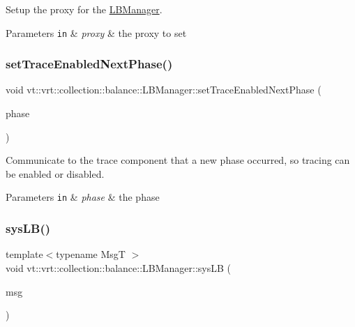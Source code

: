 Setup the proxy for the \hyperlink{structvt_1_1vrt_1_1collection_1_1balance_1_1_l_b_manager}{L\+B\+Manager}. 


\begin{DoxyParams}[1]{Parameters}
\mbox{\tt in}  & {\em proxy} & the proxy to set \\
\hline
\end{DoxyParams}
\mbox{\label{structvt_1_1vrt_1_1collection_1_1balance_1_1_l_b_manager_abb0411627a6282d0c08dd1c6b42046f7}} 
\subsubsection{\texorpdfstring{set\+Trace\+Enabled\+Next\+Phase()}{setTraceEnabledNextPhase()}}
{\footnotesize\ttfamily void vt\+::vrt\+::collection\+::balance\+::\+L\+B\+Manager\+::set\+Trace\+Enabled\+Next\+Phase (\begin{DoxyParamCaption}\item[{\hyperlink{namespacevt_a46ce6733d5cdbd735d561b7b4029f6d7}{Phase\+Type}}]{phase }\end{DoxyParamCaption})}



Communicate to the trace component that a new phase occurred, so tracing can be enabled or disabled. 


\begin{DoxyParams}[1]{Parameters}
\mbox{\tt in}  & {\em phase} & the phase \\
\hline
\end{DoxyParams}
\mbox{\label{structvt_1_1vrt_1_1collection_1_1balance_1_1_l_b_manager_a5a3a3a1c74201981c2d62b85c2e84006}} 
\subsubsection{\texorpdfstring{sys\+L\+B()}{sysLB()}}
{\footnotesize\ttfamily template$<$typename MsgT $>$ \\
void vt\+::vrt\+::collection\+::balance\+::\+L\+B\+Manager\+::sys\+LB (\begin{DoxyParamCaption}\item[{MsgT $\ast$}]{msg }\end{DoxyParamCaption})\hspace{0.3cm}{\ttfamily [inline]}}



